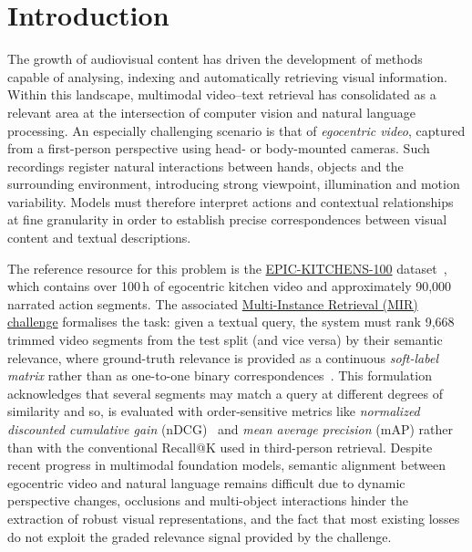 \section{Introduction}
\label{sec:intro}

The growth of audiovisual content has driven the development of methods capable of analysing, indexing and automatically retrieving visual information. Within this landscape, multimodal video--text retrieval has consolidated as a relevant area at the intersection of computer vision and natural language processing. An especially challenging scenario is that of \emph{egocentric video}, captured from a first-person perspective using head- or body-mounted cameras. Such recordings register natural interactions between hands, objects and the surrounding environment, introducing strong viewpoint, illumination and motion variability. Models must therefore interpret actions and contextual relationships at fine granularity in order to establish precise correspondences between visual content and textual descriptions.

The reference resource for this problem is the \href{https://epic-kitchens.github.io/}{EPIC-KITCHENS-100} dataset~\cite{damen2022rescaling}, which contains over 100\,h of egocentric kitchen video and approximately 90{,}000 narrated action segments. The associated \href{https://www.codabench.org/competitions/12008/\#/pages-tab}{Multi-Instance Retrieval (MIR) challenge} formalises the task: given a textual query, the system must rank 9{,}668 trimmed video segments from the test split (and vice versa) by their semantic relevance, where ground-truth relevance is provided as a continuous \emph{soft-label matrix} rather than as one-to-one binary correspondences~\cite{damen2022rescaling,wray2021semantic}. This formulation acknowledges that several segments may match a query at different degrees of similarity and so, is evaluated with order-sensitive metrics like \emph{normalized discounted cumulative gain} (nDCG)~\cite{jarvelin2002ndcg} and \emph{mean average precision} (mAP) rather than with the conventional Recall@K used in third-person retrieval. Despite recent progress in multimodal foundation models, semantic alignment between egocentric video and natural language remains difficult due to dynamic perspective changes, occlusions and multi-object interactions hinder the extraction of robust visual representations, and the fact that most existing losses do not exploit the graded relevance signal provided by the challenge.


